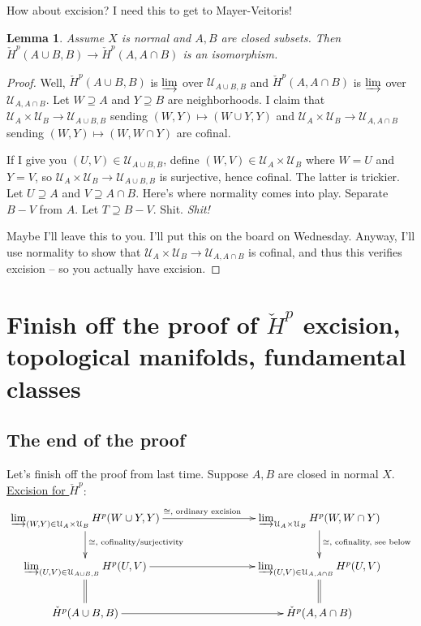 \documentclass{amsart}
\theoremstyle{theorem}
\newtheorem{lemma}[theorem]{Lemma}
\theoremstyle{definition}
\newcommand\cHH{\check{H}}
\begin{document}
How about excision? I need this to get to Mayer-Veitoris!
\begin{lemma}
Assume $X$ is normal and $A,B$ are closed subsets. Then $\cHH^p(A\cup B,B)\to\cHH^p(A,A\cap B)$ is an isomorphism. 
\end{lemma}
\begin{proof}
Well, $\cHH^p(A\cup B,B)$ is $\varinjlim$ over $\mathcal{U}_{A\cup B,B}$ and $\cHH^p(A,A\cap B)$ is $\varinjlim$ over $\mathcal{U}_{A,A\cap B}$. Let $W\supseteq A$ and $Y\supseteq B$ are neighborhoods. I claim that $\mathcal{U}_A\times\mathcal{U}_B\to\mathcal{U}_{A\cup B,B}$ sending $(W,Y)\mapsto (W\cup Y,Y)$ and $\mathcal{U}_A\times\mathcal{U}_B\to\mathcal{U}_{A,A\cap B}$ sending $(W,Y)\mapsto (W,W\cap Y)$ are cofinal.

If I give you $(U,V)\in \mathcal{U}_{A\cup B,B}$, define $(W,V)\in\mathcal{U}_A\times\mathcal{U}_B$ where $W=U$ and $Y=V$, so $\mathcal{U}_A\times\mathcal{U}_B\to\mathcal{U}_{A\cup B,B}$ is surjective, hence cofinal. The latter is trickier. Let $U\supseteq A$ and $V\supseteq A\cap B$. Here's where normality comes into play. Separate $B-V$ from $A$. Let $T\supseteq B-V$. Shit. \emph{Shit!}

Maybe I'll leave this to you. I'll put this on the board on Wednesday. Anyway, I'll use normality to show that $\mathcal{U}_A\times\mathcal{U}_B\to\mathcal{U}_{A,A\cap B}$ is cofinal, and thus this verifies excision -- so you actually have excision.
\end{proof}
\section{Finish off the proof of $\cHH^p$ excision, topological manifolds, fundamental classes}
\subsection{The end of the proof}
Let's finish off the proof from last time. Suppose $A,B$ are closed in normal $X$. \underline{Excision for $\cHH^p$}:
\begin{equation*}
\xymatrix{
	\varinjlim_{(W,Y)\in\mathcal{U}_A\times\mathcal{U}_B}H^p(W\cup Y,Y)\ar[rrr]^{\cong,\text{ ordinary excision}}\ar[d]^{\cong,\text{ cofinality/surjectivity}} & & & \varinjlim_{\mathcal{U}_A\times\mathcal{U}_B}H^p(W,W\cap Y)\ar[d]^{\cong,\text{ cofinality, see below}}\\
	\varinjlim_{(U,V)\in\mathcal{U}_{A\cup B,B}}H^p(U,V)\ar[rrr]\ar@{=}[d] & & & \varinjlim_{(U,V)\in\mathcal{U}_{A,A\cap B}}H^p(U,V)\ar@{=}[d]\\
	\cHH^p(A\cup B,B)\ar[rrr] & & & \cHH^p(A,A\cap B)
}
\end{equation*}
\end{document}
